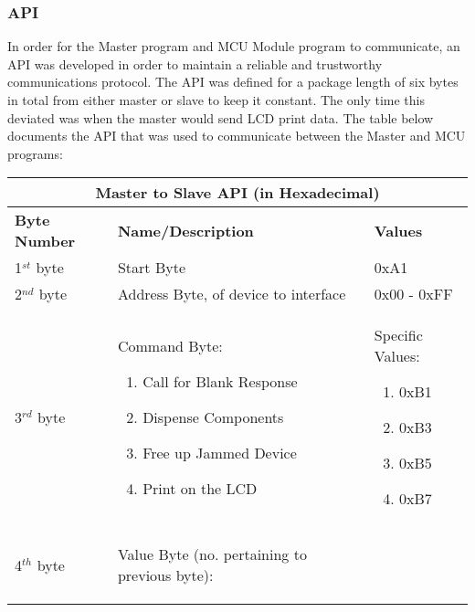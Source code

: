 \documentclass[a4paper,11pt]{article}
\numberwithin{figure}{section}
\numberwithin{table}{section}
\begin{document}
\subsubsection{API}
\label{subsubsec:API}
In order for the Master program and MCU Module program to communicate, an API was developed in order to maintain a reliable and trustworthy communications protocol. The API was defined for a package length of six bytes in total from either master or slave to keep it constant. The only time this deviated was when the master would send LCD print data. The table below documents the API that was used to communicate between the Master and MCU programs:
	\begin{center}
		\begin{table}[ht]
			\centering
			\begin{tabular}{| m{3cm} | m{5cm}| m{5cm} |}
			\hline
			\multicolumn{3}{|c|}{\bfseries Master to Slave API (in Hexadecimal)}\\
			\hline
			\bfseries{Byte Number}  & \bfseries{Name/Description} & \bfseries{Values} \\
			\hline
			1$^{st}$ byte & Start Byte & 0xA1\\
			\hline
			2$^{nd}$ byte & Address Byte, of device to interface & 0x00 - 0xFF \\
			\hline
			3$^{rd}$ byte & Command Byte: \begin{enumerate}
											\setlength{\itemsep}{0pt}
   											\setlength{\parskip}{0pt}
    										\setlength{\parsep}{0pt}  
											\item Call for Blank Response
											\item Dispense Components
											\item Free up Jammed Device
											\item Print on the LCD
										\end{enumerate}	& Specific Values:\begin{enumerate}
																			\setlength{\itemsep}{0pt}
   																			\setlength{\parskip}{0pt}
    																		\setlength{\parsep}{0pt} 
																			\item 0xB1
																			\item 0xB3
																			\item 0xB5
																			\item 0xB7 
																		\end{enumerate}\\
			\hline
			4$^{th}$ byte & Value Byte (no. pertaining to previous byte): \begin{enumerate}

\end{enumerate}
\end{tabular}
\end{table}
\end{center}
\end{document}
